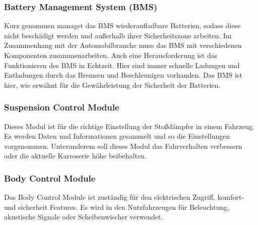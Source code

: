         \subsubsection{Battery Management System (BMS)}
        Kurz genommen managet das BMS wiederaufladbare Batterien, sodass diese nicht beschädigt werden und außerhalb ihrer
        Sicherheitszone arbeiten. Im Zusammenhang mit der Automobilbranche muss das BMS mit verschiedenen Komponenten
        zusammenarbeiten. Auch eine Herausforderung ist das Funktionieren des BMS in Echtzeit. Hier sind immer schnelle
        Ladungen und Entladungen durch das Bremsen und Beschleunigen vorhanden. Das BMS ist hier, wie erwähnt für die
        Gewährleistung der Sicherheit der Batterien.
        ~\cite{BMS.PB1} ~\cite{BMS.PB2}

        \subsubsection{Suspension Control Module}
        Dieses Modul ist für die richtige Einstellung der Stoßdämpfer in einem Fahrzeug. Es werden Daten und Informationen
        gesammelt und so die Einstellungen vorgenommen. Unteranderem soll dieses Modul das Fahrverhalten verbessern oder
        die aktuelle Karroserie höhe beibehalten.
        ~\cite{suspensioncontrol.PB1}

        \subsubsection{Body Control Module}
        Das Body Control Module ist zuständig für den elektrischen Zugriff, komfort- und sicherheit Features. Es wird in
        den Nutzfahrzeugen für Beleuchtung, akustische Signale oder Scheibenwischer verwendet.
        ~\cite{BCM.PB1}